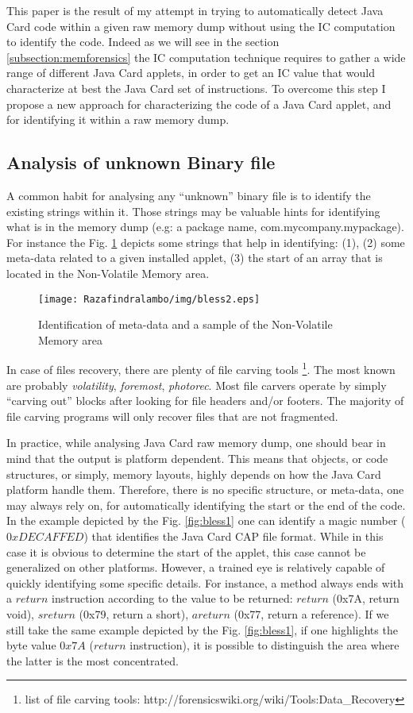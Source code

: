 This paper is the result of my attempt in trying to automatically detect Java Card code
within a given raw memory dump without using the IC computation to identify the code. Indeed as we will see in the section \ref{subsection:memforensics} the IC computation technique requires to gather a wide range of different Java Card applets, in order to get an IC value that would characterize at best the Java Card set of instructions.
To overcome this step I propose a new approach for characterizing the code of a Java Card applet, and for identifying it within a raw memory dump.

\subsection{Analysis of unknown Binary file}
A common habit for analysing any ``unknown'' binary file is to identify the existing strings within
it. Those strings may be valuable hints for identifying what is in the memory dump (e.g: a package
name, com.mycompany.mypackage). For instance the Fig. \ref{fig:bless2} depicts some strings that help in identifying: (1), (2) some meta-data related to a given installed applet, (3) the start of an array that is located in the Non-Volatile Memory area. 
\begin{figure}[!h]
\center
    \texttt{[image: Razafindralambo/img/bless2.eps]}
    \caption{Identification of meta-data and a sample of the Non-Volatile Memory area}
    \label{fig:bless2}
\end{figure}
In case of files recovery, there are plenty of file carving tools
\footnote{list of file carving tools: http://forensicswiki.org/wiki/Tools:Data\_Recovery}. The most
known are probably \textit{volatility}, \textit{foremost}, \textit{photorec}.  Most file carvers
operate by simply ``carving out'' blocks after looking for file headers and/or footers. The majority
of file carving programs will only recover files that are not fragmented. 

In practice, while analysing Java Card raw memory dump, one should bear in mind
that the output is platform dependent.  This means that objects, or code
structures, or simply, memory layouts, highly depends on how the Java Card
platform handle them. Therefore, there is no specific structure, or meta-data,
one may always rely on, for automatically identifying the start or the end of the
code. In the example depicted by the Fig. \ref{fig:bless1} one can identify a magic number ($0xDECAFFED$) that identifies the Java Card CAP file format. While in this case it is obvious to determine the start of the applet, this case cannot be generalized on other platforms. However, a trained eye is relatively capable of quickly identifying some
specific details. For instance, a method always ends with a $return$
instruction according to the value to be returned: $return$ (0x7A, return
void), $sreturn$ (0x79, return a short), $areturn$ (0x77, return a reference).
If we still take the same example depicted by the Fig. \ref{fig:bless1}, if one highlights the byte
value $0x7A$ ($return$ instruction), it is possible to distinguish the area where the latter is the
most concentrated.  

